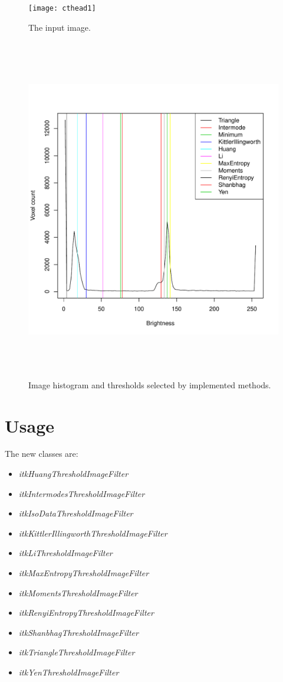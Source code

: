 \documentclass{InsightArticle}
\begin{document}
\begin{figure}[htbp]
\centering
\texttt{[image: cthead1]}
\caption{The input image.\label{fig:cthead}}
\end{figure}

\begin{figure}[htbp]
\centering
\includegraphics[height=15cm]{hist_results}
\caption{Image histogram and thresholds selected by implemented methods.\label{fig:thresh}}
\end{figure}

\section{Usage}
The new classes are:
\begin{itemize}
\item {\em itkHuangThresholdImageFilter}
\item {\em itkIntermodesThresholdImageFilter}
\item {\em itkIsoDataThresholdImageFilter}
\item {\em itkKittlerIllingworthThresholdImageFilter}
\item {\em itkLiThresholdImageFilter}
\item {\em itkMaxEntropyThresholdImageFilter}
\item {\em itkMomentsThresholdImageFilter}
\item {\em itkRenyiEntropyThresholdImageFilter}
\item {\em itkShanbhagThresholdImageFilter}
\item {\em itkTriangleThresholdImageFilter}
\item {\em itkYenThresholdImageFilter}
\end{itemize}
\end{document}
